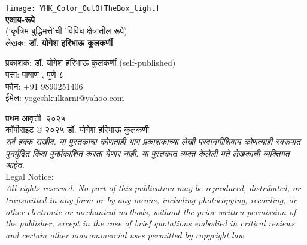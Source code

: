 \thispagestyle{empty}

\begin{center}
\texttt{[image: YHK\_Color\_OutOfTheBox\_tight]} \\[1.5em]

\textbf{\Huge एआय-रूपे}\\ [0.5em]
{\small(`कृत्रिम बुद्धिमत्ते'ची 'विविध क्षेत्रातील रूपे)}\\[0.5em]

लेखक: \textbf{{\large डॉ. योगेश हरिभाऊ कुलकर्णी}}\\[1.5em]
\end{center}

\vspace{3.5em}

\begin{flushleft}

प्रकाशक: डॉ. योगेश हरिभाऊ कुलकर्णी (self-published)\\
पत्ता:  पाषाण ,  पुणे ८ \\
फोन:  +91 9890251406\\
ईमेल: yogeshkulkarni@yahoo.com\\[1.5em]

\vspace{3.5em}

प्रथम आवृत्ती: २०२५\\[0.5em]


कॉपीराइट © २०२५ डॉ. योगेश हरिभाऊ कुलकर्णी\\[0.5em]

{\textit{सर्व हक्क राखीव. या पुस्तकाचा कोणताही भाग प्रकाशकाच्या लेखी परवानगीशिवाय कोणत्याही स्वरूपात पुनर्मुद्रित किंवा पुनर्प्रकाशित करता येणार नाही.  या पुस्तकात व्यक्त केलेली मते लेखकाची व्यक्तिगत आहेत.}}\\[1.5em]

{\large Legal Notice:}\\
{\textit{All rights reserved. No part of this publication may be reproduced, distributed, or transmitted in any form or by any means, including photocopying, recording, or other electronic or mechanical methods, without the prior written permission of the publisher, except in the case of brief quotations embodied in critical reviews and certain other noncommercial uses permitted by copyright law.}}
\end{flushleft}
\vfill\null
\clearpage

